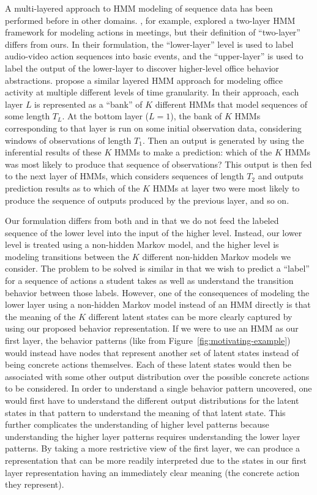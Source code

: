 A multi-layered approach to HMM modeling of sequence data has been
performed before in other domains. \citet{Zhang:2004:CVPR}, for example,
explored a two-layer HMM framework for modeling actions in meetings, but
their definition of ``two-layer'' differs from ours. In their formulation,
the ``lower-layer'' level is used to label audio-video action sequences
into basic events, and the ``upper-layer'' is used to label the output of
the lower-layer to discover higher-level office behavior abstractions.
\citet{Oliver:2004:CVIU} propose a similar layered HMM approach
for modeling office activity at multiple different levels of time
granularity. In their approach, each layer $L$ is represented as a ``bank''
of $K$ different HMMs that model sequences of some length $T_L$. At the
bottom layer ($L = 1$), the bank of $K$ HMMs corresponding to that layer is
run on some initial observation data, considering windows of observations
of length $T_1$. Then an output is generated by using the inferential
results of these $K$ HMMs to make a prediction: which of the $K$ HMMs was
most likely to produce that sequence of observations? This output is then
fed to the next layer of HMMs, which considers sequences of length $T_2$
and outputs prediction results as to which of the $K$ HMMs at layer two
were most likely to produce the sequence of outputs produced by the
previous layer, and so on.

Our formulation differs from both \citet{Zhang:2004:CVPR} and
\citet{Oliver:2004:CVIU} in that we do not feed the labeled sequence of the
lower level into the input of the higher level. Instead, our lower level is
treated using a non-hidden Markov model, and the higher level is modeling
transitions between the $K$ different non-hidden Markov models we consider.
The problem to be solved is similar in that we wish to predict a ``label''
for a sequence of actions a student takes as well as understand the
transition behavior between those labels.  However, one of the consequences
of modeling the lower layer using a non-hidden Markov model instead of an
HMM directly is that the meaning of the $K$ different latent states can be
more clearly captured by using our proposed behavior representation. If we
were to use an HMM as our first layer, the behavior patterns (like from
Figure~\ref{fig:motivating-example}) would instead have nodes that
represent another set of latent states instead of being concrete actions
themselves. Each of these latent states would then be associated with some
other output distribution over the possible concrete actions to be
considered. In order to understand a single behavior pattern uncovered, one
would first have to understand the different output distributions for the
latent states in that pattern to understand the meaning of that latent
state. This further complicates the understanding of higher level patterns
because understanding the higher layer patterns requires understanding the
lower layer patterns. By taking a more restrictive view of the first layer,
we can produce a representation that can be more readily interpreted due to
the states in our first layer representation having an immediately clear
meaning (the concrete action they represent).


